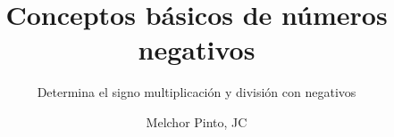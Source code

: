 \documentclass{guia}
\title{Conceptos básicos de números negativos}
\subtitle{Determina el signo multiplicación y división con negativos}
\author{Melchor Pinto, JC}
\begin{document}
%
\begin{questions}
\questionboxed{}
\end{questions}
\end{document}
